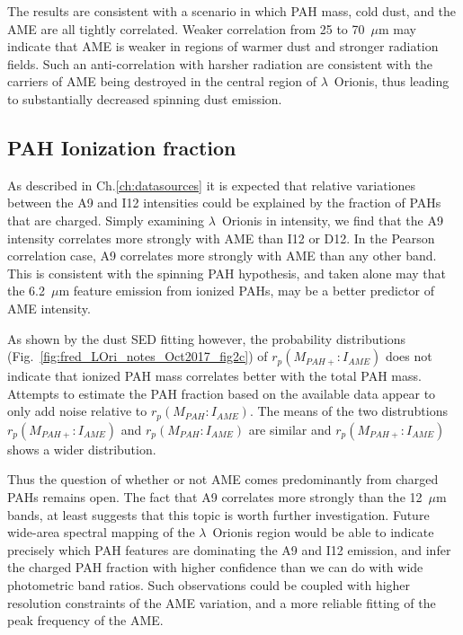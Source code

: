         The results are consistent with a scenario in which PAH mass, cold dust, and the AME are all tightly correlated. Weaker correlation from 25 to 70~$\mu$m may indicate that AME is weaker in regions of warmer dust and stronger radiation fields. Such an anti-correlation with harsher radiation are consistent with the carriers of AME being destroyed in the central region of $\lambda$~Orionis, thus leading to substantially decreased spinning dust emission.

      \subsection{PAH Ionization fraction}
          As described in Ch.\ref{ch:datasources} it is expected that relative variationes between the A9 and I12 intensities could be explained by the fraction of PAHs that are charged. Simply examining $\lambda$~Orionis in intensity, we find that the A9 intensity correlates more strongly with AME than I12 or D12. In the Pearson correlation case, A9 correlates more strongly with AME than any other band. This is consistent with the spinning PAH hypothesis, and taken alone may that the 6.2~$\mu$m feature emission from ionized PAHs, may be a better predictor of AME intensity.

          As shown by the dust SED fitting however, the probability distributions (Fig.~\ref{fig:fred_LOri_notes_Oct2017_fig2c}) of $r_{p}(M_{PAH+}:I_{AME})$ does not indicate that ionized PAH mass correlates better with the total PAH mass. Attempts to estimate the PAH fraction based on the available data appear to only add noise relative to $r_{p}(M_{PAH}:I_{AME})$. The means of the two distrubtions $r_{p}(M_{PAH+}:I_{AME})$  and $r_{p}(M_{PAH}:I_{AME})$ are similar and $r_{p}(M_{PAH+}:I_{AME})$ shows a wider distribution.

         Thus the question of whether or not AME comes predominantly from charged PAHs remains open. The fact that A9 correlates more strongly than the 12~$\mu$m bands, at least suggests that this topic is worth further investigation. Future wide-area spectral mapping of the $\lambda$~Orionis region would be able to indicate precisely which PAH features are dominating the A9 and I12 emission, and infer the charged PAH fraction with higher confidence than we can do with wide photometric band ratios. Such observations could be coupled with higher resolution constraints of the AME variation, and a more reliable fitting of the peak frequency of the AME.
